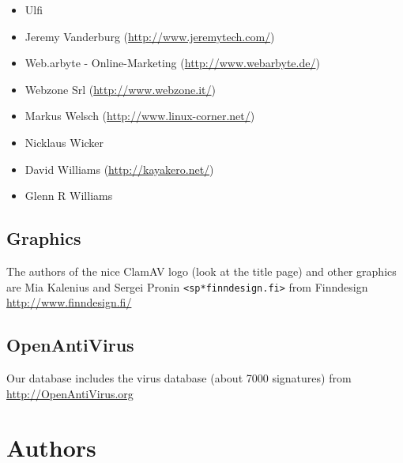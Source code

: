 \documentclass[a4paper,titlepage,12pt]{article}
\newcommand{\email}[1]{\texttt{#1}}
\begin{document}
\begin{itemize}
	\item Ulfi
	\item Jeremy Vanderburg (\url{http://www.jeremytech.com/})
	\item Web.arbyte - Online-Marketing (\url{http://www.webarbyte.de/})
	\item Webzone Srl (\url{http://www.webzone.it/})
	\item Markus Welsch (\url{http://www.linux-corner.net/})
	\item Nicklaus Wicker
	\item David Williams (\url{http://kayakero.net/})
	\item Glenn R Williams
    \end{itemize}

    \subsection{Graphics}
    The authors of the nice ClamAV logo (look at the title page) and other
    graphics are Mia Kalenius and Sergei Pronin \email{<sp*finndesign.fi>}
    from Finndesign \url{http://www.finndesign.fi/}

    \subsection{OpenAntiVirus}
    Our database includes the virus database (about 7000 signatures) from\\
    \url{http://OpenAntiVirus.org}

    \section{Authors}
\end{document}
